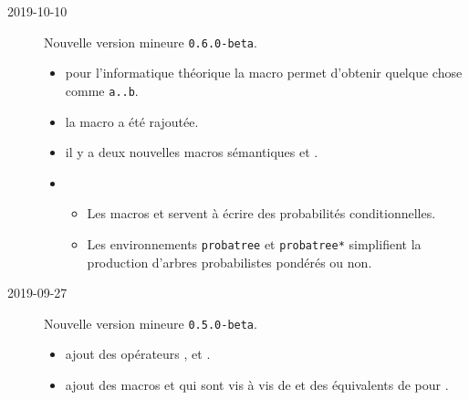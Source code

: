 \documentclass[12pt,a4paper]{article}
\begin{document}
\begin{description}

    \medskip
    \item[2019-10-10] Nouvelle version mineure \verb+0.6.0-beta+.
    
    \begin{itemize}[itemsep=.5em]
        \item {}
        	  pour l'informatique théorique la macro  permet d'obtenir quelque chose comme \verb+a..b+.
    
    
    
    
        \item {}
              la macro  a été rajoutée.
    
    
    
    
        \item {}
              il y a deux nouvelles macros sémantiques  et .
    
    
    
    
        \item {}
        \begin{itemize}[itemsep=.5em]
            \item Les macros  et  servent à écrire des probabilités conditionnelles.
    
            \item Les environnements \verb+probatree+ et \verb+probatree*+ simplifient la production d'arbres probabilistes pondérés ou non.
        \end{itemize}
    \end{itemize}


    \medskip
    \item[2019-09-27] Nouvelle version mineure \verb+0.5.0-beta+.
    
    \begin{itemize}[itemsep=.5em]
        \item {}
              ajout des opérateurs ,  et .
    
    
    
    
        \item {}
               ajout des macros  et  qui sont vis à vis de  et  des équivalents de  pour .
    

\end{itemize}
\end{description}
\end{document}
